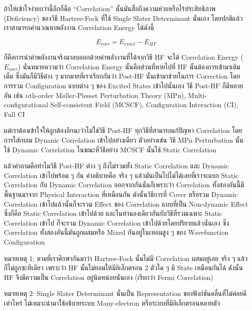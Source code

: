 ถ้าให้เข้าใจง่ายกว่านี้อีกก็คือ \enquote{Correlation} นั้นมันสื่อถึงความห่วยหรือไร้ประสิทธิภาพ (Deficiency) ของวิธี Hartree-Fock ที่ใช้
Single Slater Determinant นั่นเอง โดยปกติแล้วเราสามารถคำนวณหาพลังงาน Correlation Energy ได้ดังนี้

\begin{equation}
    E_{corr} = E_{exact} - E_{HF}
\end{equation}

\noindent ก็คือการนำค่าพลังงานจริงมาลบออกด้วยค่าพลังงานที่ได้จากวิธี HF จะได้ Correlation Energy ($E_{corr}$) นั่นหมายความว่า
Correlation Energy นั้นคือส่วนที่หายไปที่ HF นั้นต้องการเข้ามาเติมเต็ม ซึ่งมันก็มีวิธีต่าง ๆ มากมายที่เราเรียกกันว่า Post-HF นั้นเข้ามาช่วยในการ
Correction โดยการรวม Configuration แบบต่าง ๆ ของ Excited States เข้าไปนั่นเอง วิธี Post-HF ก็มีหลายอัน เช่น $n$th-order
Møller-Plesset Perturbation Theory (MPn), Multi-configurational Self-consistent Field (MCSCF), Configuration
Interaction (CI), Full CI

แต่เราต้องเข้าใจให้ถูกต้องอีกนะว่าไม่ใช่วิธี Post-HF ทุกวิธีที่สามารถแก้ปัญหา Correlation โดยการใส่เทอม Dynanic Correlation เข้าไปอย่างเดียว
ตัวอย่างเช่น วิธี MPn Perturbation นั้นใช้ Dynamic Correlation ในขณะที่วิธีอย่าง MCSCF นั้นใช้ Static Correlation

แล้วคำถามคือทำไมวิธี Post-HF ต่าง ๆ ถึงไม่รวมทั้ง Static Correlation และ Dynamic Correlation เข้าไปพร้อม ๆ กัน
คำอธิบายคือ จริง ๆ แล้วมันเป็นไปไม่ได้เลยที่เราจะแยก Static Correlation กับ Dynamic Correlation ออกจากกันนั่นก็เพราะว่า Correlation
ทั้งสองอันนี้มีพื้นฐานมาจาก Physical Interaction ที่เหมือนกัน ดังนั้นวิธีการที่ Cover หรือรวม Dynamic Correlation เข้าไปแล้วนั้นก็จะรวม
Effect ของ Correlation แบบที่เป็น Non-dynamic Effect ซึ่งก็คือ Static Correlation เข้าไปด้วย และในทำนองเดียวกันกับวิธีที่รวมเฉพาะ
Static Correlation เข้าไป ก็จะรวม Dynamic Correlation เข้าไปด้วยโดยปริยายแล้วนั่นเอง ซึ่ง Correlation ทั้งสองอันนี้มันถูกผสมหรือ
Mixed กันอยู่ในเทอมสูง ๆ ของ Wavefunction Configuration

\noindent หมายเหตุ 1: ตามที่เราศึกษากันมาว่า Hartree-Fock นั้นไม่มี Correlation ผสมอยู่เลย จริง ๆ แล้วก็ไม่ถูกซะทีเดียว เพราะว่า HF
นั้นไม่ยอมให้มีอิเล็กตรอน 2 ตัวใด ๆ มี State เหมือนกันได้ ดังนั้น HF จึงมีความเป็น Correlation อยู่นิดหน่อยนั่นเอง (เรียกว่า Fermi Correlation)

\noindent หมายเหตุ 2: Single Slater Determinant นั้นเป็น Representation ของฟังก์ชันคลื่นที่ไม่ค่อยดีเท่าไหร่
ไม่เหมาะนำมาใช้อธิบายระบบ Many-electron หรือระบบที่มีอิเล็กตรอนหลายตัว

